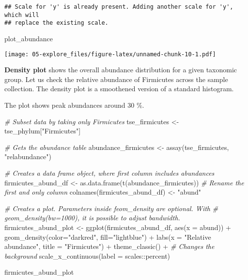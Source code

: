 \documentclass[
  oneside]{book}
\newenvironment{Shaded}{\begin{snugshade}}{\end{snugshade}}
\newcommand{\AttributeTok}[1]{\textcolor[rgb]{0.77,0.63,0.00}{#1}}
\newcommand{\CommentTok}[1]{\textcolor[rgb]{0.56,0.35,0.01}{\textit{#1}}}
\newcommand{\FunctionTok}[1]{\textcolor[rgb]{0.00,0.00,0.00}{#1}}
\newcommand{\NormalTok}[1]{#1}
\newcommand{\OtherTok}[1]{\textcolor[rgb]{0.56,0.35,0.01}{#1}}
\newcommand{\SpecialCharTok}[1]{\textcolor[rgb]{0.00,0.00,0.00}{#1}}
\newcommand{\StringTok}[1]{\textcolor[rgb]{0.31,0.60,0.02}{#1}}
\begin{document}
\begin{verbatim}
## Scale for 'y' is already present. Adding another scale for 'y', which will
## replace the existing scale.
\end{verbatim}

\begin{Shaded}
\begin{Highlighting}[]
\NormalTok{plot\_abundance }
\end{Highlighting}
\end{Shaded}

\texttt{[image: 05-explore\_files/figure-latex/unnamed-chunk-10-1.pdf]}

\textbf{Density plot} shows the overall abundance distribution for a given
taxonomic group. Let us check the relative abundance of Firmicutes
across the sample collection. The density plot is a smoothened
version of a standard histogram.

The plot shows peak abundances around 30 \%.

\begin{Shaded}
\begin{Highlighting}[]
\CommentTok{\# Subset data by taking only Firmicutes}
\NormalTok{tse\_firmicutes }\OtherTok{\textless{}{-}}\NormalTok{ tse\_phylum[}\StringTok{"Firmicutes"}\NormalTok{]}

\CommentTok{\# Gets the abundance table}
\NormalTok{abundance\_firmicutes }\OtherTok{\textless{}{-}} \FunctionTok{assay}\NormalTok{(tse\_firmicutes, }\StringTok{"relabundance"}\NormalTok{)}

\CommentTok{\# Creates a data frame object, where first column includes abundances}
\NormalTok{firmicutes\_abund\_df }\OtherTok{\textless{}{-}} \FunctionTok{as.data.frame}\NormalTok{(}\FunctionTok{t}\NormalTok{(abundance\_firmicutes))}
\CommentTok{\# Rename the first and only column}
\FunctionTok{colnames}\NormalTok{(firmicutes\_abund\_df) }\OtherTok{\textless{}{-}} \StringTok{"abund"}

\CommentTok{\# Creates a plot. Parameters inside feom\_density are optional. With }
\CommentTok{\# geom\_density(bw=1000), it is possible to adjust bandwidth.}
\NormalTok{firmicutes\_abund\_plot }\OtherTok{\textless{}{-}} \FunctionTok{ggplot}\NormalTok{(firmicutes\_abund\_df, }\FunctionTok{aes}\NormalTok{(}\AttributeTok{x =}\NormalTok{ abund)) }\SpecialCharTok{+} 
  \FunctionTok{geom\_density}\NormalTok{(}\AttributeTok{color=}\StringTok{"darkred"}\NormalTok{, }\AttributeTok{fill=}\StringTok{"lightblue"}\NormalTok{) }\SpecialCharTok{+} 
  \FunctionTok{labs}\NormalTok{(}\AttributeTok{x =} \StringTok{"Relative abundance"}\NormalTok{, }\AttributeTok{title =} \StringTok{"Firmicutes"}\NormalTok{) }\SpecialCharTok{+}
  \FunctionTok{theme\_classic}\NormalTok{() }\SpecialCharTok{+} \CommentTok{\# Changes the background}
  \FunctionTok{scale\_x\_continuous}\NormalTok{(}\AttributeTok{label =}\NormalTok{ scales}\SpecialCharTok{::}\NormalTok{percent)}

\NormalTok{firmicutes\_abund\_plot}
\end{Highlighting}
\end{Shaded}
\end{document}

